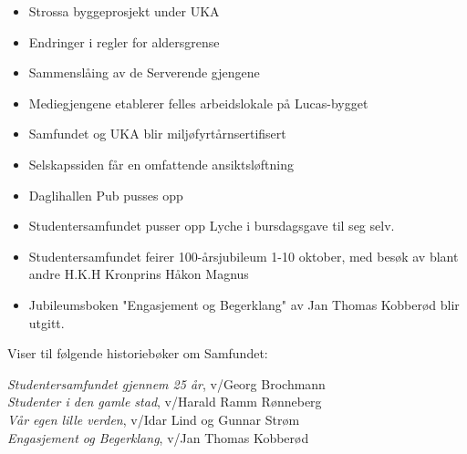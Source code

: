 
\begin{itemize}
 \item Strossa byggeprosjekt under UKA
 \item Endringer i regler for aldersgrense
 \item Sammenslåing av de Serverende gjengene
 \item Mediegjengene etablerer felles arbeidslokale på Lucas-bygget
 \item Samfundet og UKA blir miljøfyrtårnsertifisert
 \item Selskapssiden får en omfattende ansiktsløftning
 \item Daglihallen Pub pusses opp
\end{itemize}


\begin{itemize}
 \item Studentersamfundet pusser opp Lyche i bursdagsgave til seg selv.
 \item Studentersamfundet feirer 100-årsjubileum 1-10 oktober, med besøk av blant andre H.K.H Kronprins Håkon 
 Magnus
 \item Jubileumsboken "Engasjement og Begerklang" av Jan Thomas Kobberød blir utgitt.
\end{itemize}

Viser til følgende historiebøker om Samfundet:

\textit{Studentersamfundet gjennem 25 år}, v/Georg Brochmann\\
\textit{Studenter i den gamle stad}, v/Harald Ramm Rønneberg\\
\textit{Vår egen lille verden}, v/Idar Lind og Gunnar Strøm\\
\textit{Engasjement og Begerklang}, v/Jan Thomas Kobberød
